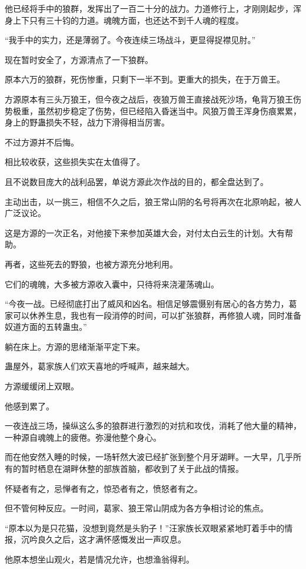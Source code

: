 \begin{this_body}
他已经将手中的狼群，发挥出了一百二十分的战力。力道修行上，才刚刚起步，浑身上下只有三十钧的力道。魂魄方面，也还达不到千人魂的程度。

“我手中的实力，还是薄弱了。今夜连续三场战斗，更显得捉襟见肘。”

现在暂时安全了，方源清点了一下狼群。

原本六万的狼群，死伤惨重，只剩下一半不到。更重大的损失，在于万兽王。

方源原本有三头万狼王，但今夜之战后，夜狼万兽王直接战死沙场，龟背万狼王伤势极重，虽然初步稳定了伤势，但已经陷入昏迷当中。风狼万兽王浑身伤痕累累，身上的野蛊损失不轻，战力下滑得相当厉害。

不过方源并不后悔。

相比较收获，这些损失实在太值得了。

且不说数目庞大的战利品罢，单说方源此次作战的目的，都全盘达到了。

主动出击，以一挑三，相信不久之后，狼王常山阴的名号将再次在北原响起，被人广泛议论。

这是方源的一次正名，对他接下来参加英雄大会，对付太白云生的计划。大有帮助。

再者，这些死去的野狼，也被方源充分地利用。

它们的魂魄，大多被方源收入囊中，只待将来浇灌荡魂山。

“今夜一战。已经彻底打出了威风和凶名。相信足够震慑别有居心的各方势力，葛家可以休养生息，我也有一段消停的时间，可以扩张狼群，再修狼人魂，同时准备奴道方面的五转蛊虫。”

躺在床上。方源的思绪渐渐平定下来。

蛊屋外，葛家族人们欢天喜地的呼喊声，越来越大。

方源缓缓闭上双眼。

他感到累了。

一夜连战三场，操纵这么多的狼群进行激烈的对抗和攻伐，消耗了他大量的精神，一种源自魂魄上的疲倦。弥漫他整个身心。

而在他安然入睡的时候，一场轩然大波已经扩张到整个月牙湖畔。一大早，几乎所有的暂时栖息在湖畔休整的部族首脑，都收到了关于此战的情报。

怀疑者有之，忌惮者有之，惊恐者有之，愤怒者有之。

但不管何种反应。一时间，葛家、狼王常山阴成为各方争相讨论的焦点。

“原本以为是只花猫，没想到竟然是头豹子！”汪家族长双眼紧紧地盯着手中的情报，沉吟良久之后，这才满怀感慨发出一声叹息。

他原本想坐山观火，若是情况允许，也想渔翁得利。


\end{this_body}

